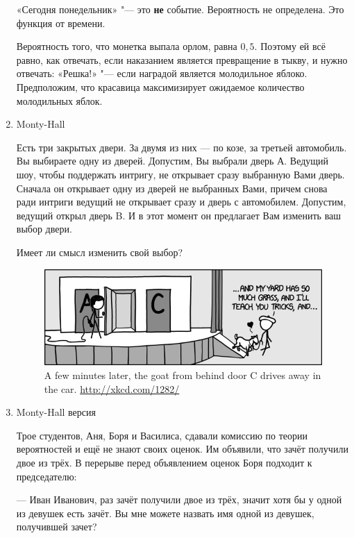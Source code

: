 \documentclass[nobib]{tufte-handout}
\begin{document}
\begin{enumerate}
\begin{solution}
«Сегодня понедельник» "--- это \textbf{не} событие. Вероятность не
определена. Это функция от времени.

Вероятность того, что монетка выпала орлом, равна $0{,}5$. Поэтому ей
всё равно, как отвечать, если наказанием является превращение в
тыкву, и нужно отвечать: «Решка!» "--- если наградой является
молодильное яблоко. Предположим, что красавица максимизирует
ожидаемое количество молодильных яблок. 
\end{solution}

\item Monty-Hall 

Есть три закрытых двери. За двумя из них --- по козе, за третьей автомобиль. Вы выбираете одну из дверей. Допустим, Вы выбрали дверь А. Ведущий шоу, чтобы поддержать интригу, не открывает сразу выбранную Вами дверь. Сначала он открывает одну из дверей не выбранных Вами, причем снова ради интриги ведущий не открывает сразу и дверь с автомобилем. Допустим, ведущий открыл дверь B. И в этот момент он предлагает Вам изменить ваш выбор двери.

Имеет ли смысл изменить свой выбор?

\begin{figure}
  \includegraphics[width=17cm]{monty_hall}
  \caption{A few minutes later, the goat from behind door C drives away in the car. \url{http://xkcd.com/1282/}}
\end{figure}


\item Monty-Hall версия

Трое студентов, Аня, Боря и Василиса, сдавали комиссию по теории вероятностей и ещё не знают своих оценок. Им объявили, что зачёт получили двое из трёх. В перерыве перед объявлением оценок Боря подходит к председателю:

--- Иван Иванович, раз зачёт получили двое из трёх, значит хотя бы у одной из девушек есть зачёт. Вы мне можете назвать имя одной из девушек, получившей зачет?


\end{enumerate}
\end{document}
